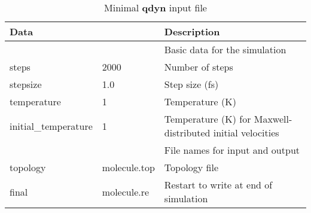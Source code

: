 \documentclass[a4paper,10pt]{article}
\begin{document}
\begin{longtable}{|p{105pt} p{60pt}|p{235pt}|}
\caption{Minimal \textbf{qdyn} input file}\\
  \hline \textbf{Data} &              & \textbf{Description} \\
  \endhead
  \hline [MD]          &              & Basic data for the simulation  \\
  \hline steps         & 2000         & Number of steps  \\
  \hline stepsize      & 1.0          & Step size (fs) \\
  \hline temperature   & 1            & Temperature (K) \\
  \hline initial{\_}temperature & 1   & Temperature (K) for Maxwell-distributed initial velocities \\
  \hline [files]       &              & File names for input and output \\
  \hline topology      & molecule.top & Topology file \\
  \hline final         & molecule.re  & Restart to write at end of simulation \\ \hline
\end{longtable}
\end{document}
